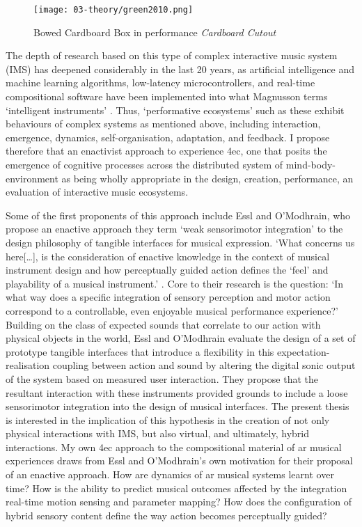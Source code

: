 \begin{wrapfigure}{l}{0.45\textwidth}
    \begin{minipage}{0.95\linewidth}
        \texttt{[image: 03-theory/green2010.png]}
        \captionsetup{justification=justified}
        \caption{Bowed Cardboard Box in performance \textit{Cardboard Cutout} \citep[from][]{green2010}}
    \end{minipage}
    \hfill
\end{wrapfigure}

The depth of research based on this type of complex interactive music system (IMS) has deepened considerably in the last 20 years, as artificial intelligence and machine learning algorithms, low-latency microcontrollers, and real-time compositional software have been implemented into what Magnusson terms `intelligent instruments' \citeyearpar[p. 8]{magnusson2009}. Thus, `performative ecosystems' \citep[]{waters2007} such as these exhibit behaviours of complex systems as mentioned above, including interaction, emergence, dynamics, self-organisation, adaptation, and feedback. I propose therefore that an enactivist approach to experience \gls{4ec}, one that posits the emergence of cognitive processes across the distributed system of mind-body-environment as being wholly appropriate in the design, creation, performance, an evaluation of interactive music ecosystems. 

Some of the first proponents of this approach include Essl and O'Modhrain, who propose an enactive approach they term `weak sensorimotor integration' to the design philosophy of tangible interfaces for musical expression. `What concerns us here[…], is the consideration of enactive knowledge in the context of musical instrument design and how perceptually guided action defines the `feel' and playability of a musical instrument.' \citeyearpar[p. 3]{essl2006}. Core to their research is the question: `In what way does a specific integration of sensory perception and motor action correspond to a controllable, even enjoyable musical performance experience?' Building on the class of expected sounds that correlate to our action with physical objects in the world, Essl and O'Modhrain evaluate the design of a set of prototype tangible interfaces that introduce a flexibility in this expectation-realisation coupling between action and sound by altering the digital sonic output of the system based on measured user interaction. They propose that the resultant interaction with these instruments provided grounds to include a loose sensorimotor integration into the design of musical interfaces. The present thesis is interested in the implication of this hypothesis in the creation of not only physical interactions with IMS, but also virtual, and ultimately, hybrid interactions. My own \gls{4ec} approach to the compositional material of \gls{ar} musical experiences draws from Essl and O'Modhrain's own motivation for their proposal of an enactive approach. How are dynamics of \gls{ar} musical systems learnt over time? How is the ability to predict musical outcomes affected by the integration real-time motion sensing and parameter mapping? How does the configuration of hybrid sensory content define the way action becomes perceptually guided?

